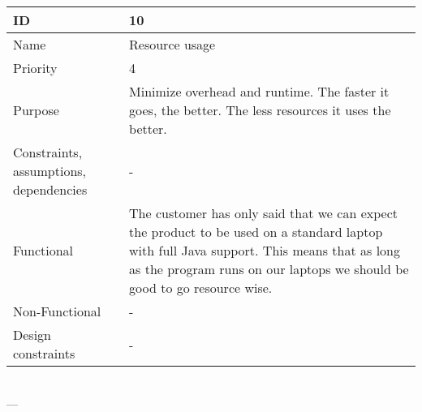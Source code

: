\begin{center}
    \begin{tabular}{| p{4cm} | p{8cm} |}
        \hline
        ID & 10 \\
        \hline
        Name & Resource usage  \\
        \hline
        Priority & 4 \\
        \hline
        Purpose & Minimize overhead and runtime. The faster it goes, the better. The less resources it uses the better. \\
        \hline 
        Constraints, assumptions, dependencies & -\\
        \hline  
        Functional & The customer has only said that we can expect the product to be used on a standard laptop with full Java support. This means that as long as the program runs on our laptops we should be good to go resource wise. \\
        \hline
        Non-Functional & -\\ 
        \hline
        Design constraints & -\\
        \hline
    \end{tabular}
    \\  ---  \\
\end{center}
